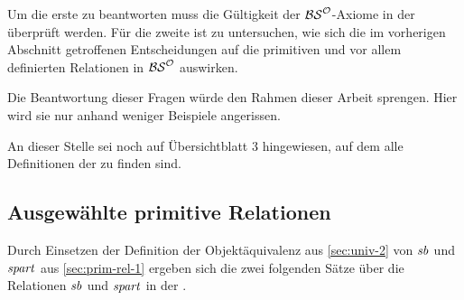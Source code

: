     Um die erste %
    zu beantworten muss die Gültigkeit der $\mathcal{BS}^{\mathcal{O}}$-Axiome in der \strukt überprüft werden.
    Für die zweite ist zu untersuchen, wie sich die im vorherigen Abschnitt getroffenen Entscheidungen auf die primitiven und vor allem definierten Relationen in $\mathcal{BS}^{\mathcal{O}}$ auswirken.

    Die Beantwortung dieser Fragen würde den Rahmen dieser Arbeit sprengen. 
    Hier wird sie nur anhand weniger Beispiele angerissen.
    
    An dieser Stelle sei noch auf Übersichtblatt 3 hingewiesen, auf dem alle Definitionen der \strukt zu finden sind.
    

\subsection{Ausgewählte primitive Relationen}
    Durch Einsetzen der Definition der Objektäquivalenz aus \ref{sec:univ-2} von $\mathit{sb}$ und $\mathit{spart}$ aus \ref{sec:prim-rel-1} ergeben sich die zwei folgenden Sätze über die Relationen $\mathit{sb}$ und $\mathit{spart}$ in der \strukt.

